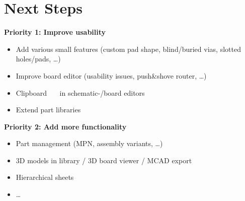 \section{Next Steps}

\begin{frame}{\secname}
  \textbf{Priority 1: Improve usability}
  \begin{itemize}
    \item Add various small features (custom pad shape, blind/buried vias,
          slotted holes/pads, \ldots)
    \item Improve board editor (usability issues, push\&shove router, \ldots)
    \item Clipboard \faCut\ \faCopy\ \faPaste\ in schematic-/board editors
    \item Extend part libraries
  \end{itemize}

  \pause

  \textbf{Priority 2: Add more functionality}
  \begin{itemize}
    \item Part management (MPN, assembly variants, \ldots)
    \item 3D models in library / 3D board viewer / MCAD export
    \item Hierarchical sheets
    \item \dots
  \end{itemize}
\end{frame}
